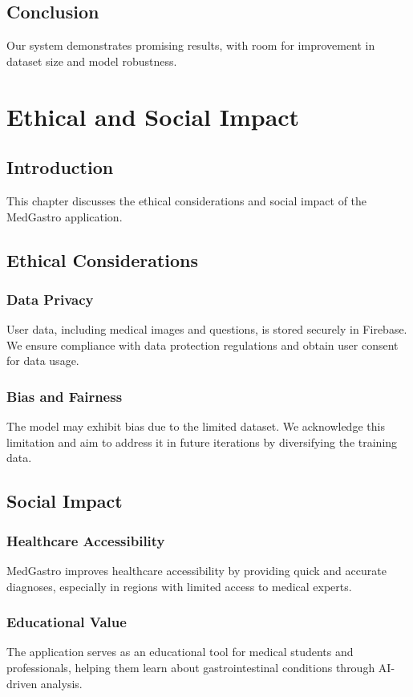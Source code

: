 \documentclass[12pt,a4paper]{report}
\begin{document}
\section{Conclusion}
Our system demonstrates promising results, with room for improvement in dataset size and model robustness.

\chapter{Ethical and Social Impact}
\section{Introduction}
This chapter discusses the ethical considerations and social impact of the MedGastro application.

\section{Ethical Considerations}
\subsection{Data Privacy}
User data, including medical images and questions, is stored securely in Firebase. We ensure compliance with data protection regulations and obtain user consent for data usage.

\subsection{Bias and Fairness}
The model may exhibit bias due to the limited dataset. We acknowledge this limitation and aim to address it in future iterations by diversifying the training data.

\section{Social Impact}
\subsection{Healthcare Accessibility}
MedGastro improves healthcare accessibility by providing quick and accurate diagnoses, especially in regions with limited access to medical experts.

\subsection{Educational Value}
The application serves as an educational tool for medical students and professionals, helping them learn about gastrointestinal conditions through AI-driven analysis.
\end{document}
